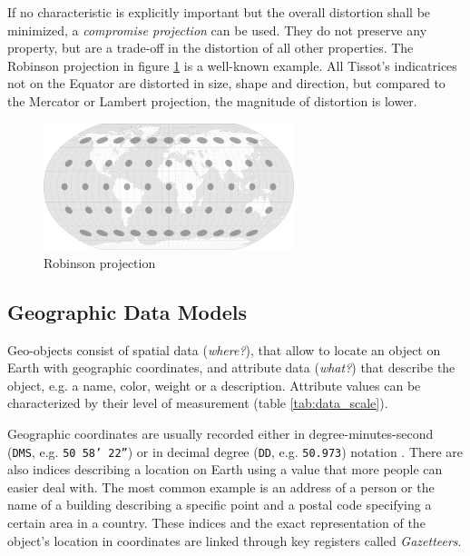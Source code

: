 If no characteristic is explicitly important but the overall distortion shall be minimized, a \emph{compromise projection} can be used. They do not preserve any property, but are a trade-off in the distortion of all other properties. The Robinson projection in figure \ref{fig:robinson_projection} is a well-known example. All Tissot's indicatrices not on the Equator are distorted in size, shape and direction, but compared to the Mercator or Lambert projection, the magnitude of distortion is lower.

\begin{figure}[ht]
  \centering
  \includegraphics[width=0.65\textwidth]{graphics/basics/projection_distortion_robinson.png}
  \caption{Robinson projection \protect\footnotemark}
  \label{fig:robinson_projection}
\end{figure}




\subsection{Geographic Data Models} %
\label{sub:data_models}

Geo-objects consist of spatial data (\emph{where?}), that allow to locate an object on Earth with geographic coordinates, and attribute data (\emph{what?}) that describe the object, e.g. a name, color, weight or a description. Attribute values can be characterized by their level of measurement (table \ref{tab:data_scale}).

Geographic coordinates are usually recorded either in degree-minutes-second (\texttt{DMS}, e.g. \texttt{50\degree~58' 22''}) or in decimal degree (\texttt{DD}, e.g. \texttt{50.973}) notation
\cite[pp. 30, 79]{bolstad2008gis}.
There are also indices describing a location on Earth using a value that more people can easier deal with. The most common example is an address of a person or the name of a building describing a specific point and a postal code specifying a certain area in a country. These indices and the exact representation of the object's location in coordinates are linked through key registers called \emph{Gazetteers}.


